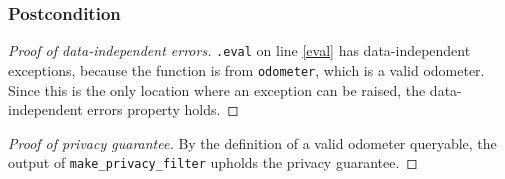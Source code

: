 \documentclass{article}
\begin{document}
\subsubsection*{Postcondition}

\begin{proof}[Proof of data-independent errors]
    \texttt{.eval} on line \ref{eval} has data-independent exceptions,
    because the function is from \texttt{odometer}, which is a valid odometer.
    Since this is the only location where an exception can be raised,
    the data-independent errors property holds.
\end{proof}

\begin{proof}[Proof of privacy guarantee]
    By the definition of a valid odometer queryable, 
    the output of \texttt{make\_privacy\_filter} upholds the privacy guarantee.
\end{proof}
\end{document}
